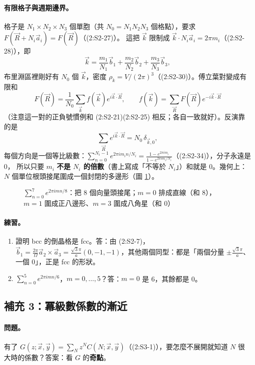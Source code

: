 \paragraph{有限格子與週期邊界。}
格子是 $N_1\times N_2\times N_3$ 個單胞（共 $N_0=N_1N_2N_3$ 個格點），要求 $F(\vec R+N_i\vec a_i)=F(\vec R)$（(2:S2-27)）。
這把 $\vec k$ 限制成 $\vec k\cdot N_i\vec a_i=2\pi m_i$（(2:S2-28)），即
\[\vec k=\frac{m_1}{N_1}\vec b_1+\frac{m_2}{N_2}\vec b_2+\frac{m_3}{N_3}\vec b_3,\tag{2:S2-29}\]
布里淵區裡剛好有 $N_0$ 個 $\vec k$，密度 $\rho_k=V/(2\pi)^3$（(2:S2-30)）。傅立葉對變成有限和
\[F(\vec R)=\frac1{N_0}\sum_{\vec k}f(\vec k)e^{i\vec k\cdot\vec R},\qquad f(\vec k)=\sum_{\vec R}F(\vec R)e^{-i\vec k\cdot\vec R}\tag{2:S2-31, 2:S2-32}\]
（注意這一對的正負號慣例和 (2:S2-21)(2:S2-25) 相反；各自一致就好）。反演靠的是
\[\sum_{\vec R}e^{i\vec k\cdot\vec R}=N_0\,\delta_{\vec k,0},\tag{2:S2-33}\]
每個方向是一個等比級數：$\sum_{n=0}^{N_i-1}e^{2\pi im_in/N_i}=\frac{1-e^{2\pi im_i}}{1-e^{2\pi im_i/N_i}}$（(2:S2-34)），分子永遠是 0，
所以只要 $m_i$ \textbf{不是 $N_i$ 的倍數}（書上寫成「不等於 $N_i$」）和就是 0。幾何上：$N$ 個單位根頭接尾圍成一個封閉的多邊形（圖 \ref{twofig-roots}）。
\begin{figure}[H]
\centering
\TwoFigRoots
\caption{$\sum_{n=0}^{7}e^{2\pi imn/8}$：把 8 個向量頭接尾；$m=0$ 排成直線（和 8），$m=1$ 圍成正八邊形、$m=3$ 圍成八角星（和 0）}\label{twofig-roots}
\end{figure}

\paragraph{練習。}
\begin{enumerate}
\item 證明 bcc 的倒晶格是 fcc。\quad 答：由 (2:S2-7)，$\vec b_1=\frac{2\pi}\Omega\vec a_2\times\vec a_3=\frac{\sqrt3\pi}{a}(0,-1,-1)$，其他兩個同型：都是「兩個分量 $\pm\frac{\sqrt3\pi}a$、一個 0」，正是 fcc 的形狀。
\item $\sum_{n=0}^{5}e^{2\pi imn/6}$，$m=0,\dots,5$？\quad 答：$m=0$ 是 6，其餘都是 0。
\end{enumerate}

\subsection{補充 3：冪級數係數的漸近}

\paragraph{問題。}
有了 $G(z;\vec x,\vec y)=\sum_Nz^NC(N;\vec x,\vec y)$（(2:S3-1)），要怎麼不展開就知道 $N$ 很大時的係數？答案：看 $G$ 的\textbf{奇點}。

